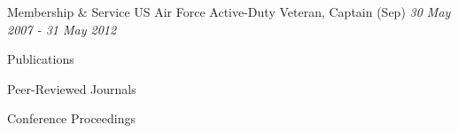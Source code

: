 \documentclass{resume} %
\begin{document}

\begin{rSection}{Membership \& Service}
US Air Force Active-Duty Veteran, Captain (Sep) \hfill {\em 30 May 2007 - 31 May 2012}
\end{rSection}


\begin{rSection}{Publications}

\begin{rSubsection}{Peer-Reviewed Journals}{}{}{}
\printbibliography[keyword=journal,heading=none]
\end{rSubsection}

\begin{rSubsection}{Conference Proceedings}{}{}{}
\printbibliography[keyword=proceeding,heading=none]
\end{rSubsection}

\end{rSection}




\end{document}
